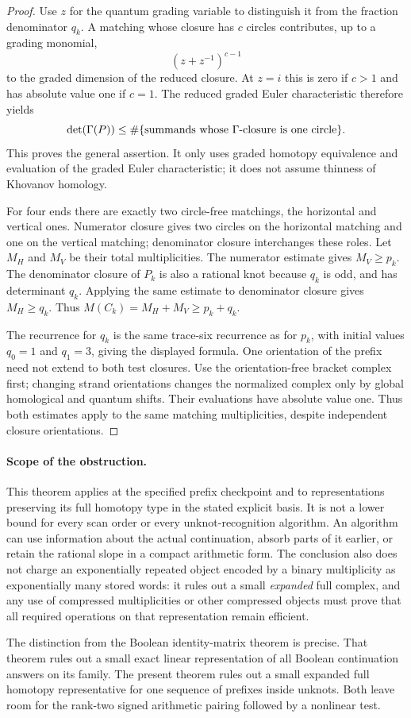 \begin{proof}
Use $z$ for the quantum grading variable to distinguish it from the
fraction denominator $q_k$.  A matching whose closure has $c$
circles contributes, up to a grading monomial,
\[
 (z+z^{-1})^{c-1}
\]
to the graded dimension of the reduced closure.  At $z=i$ this is
zero if $c>1$ and has absolute value one if $c=1$.  The reduced
graded Euler characteristic therefore yields
\[
 \det(\Gamma(P))\le
 \#\{\hbox{summands whose $\Gamma$-closure is one circle}\}.
\]
This proves the general assertion.  It only uses graded homotopy
equivalence and evaluation of the graded Euler characteristic; it
does not assume thinness of Khovanov homology.

For four ends there are exactly two circle-free matchings, the
horizontal and vertical ones.  Numerator closure gives two circles
on the horizontal matching and one on the vertical matching;
denominator closure interchanges these roles.  Let $M_H$ and $M_V$
be their total multiplicities.  The numerator estimate gives
$M_V\ge p_k$.  The denominator closure of $P_k$ is also a rational
knot because $q_k$ is odd, and has determinant $q_k$.  Applying the
same estimate to denominator closure gives $M_H\ge q_k$.  Thus
$M(C_k)=M_H+M_V\ge p_k+q_k$.

The recurrence for $q_k$ is the same trace-six recurrence as for
$p_k$, with initial values $q_0=1$ and $q_1=3$, giving the displayed
formula.  One orientation of the prefix need not extend to both test closures.
Use the orientation-free bracket complex first; changing strand orientations
changes the normalized complex only by global homological and quantum shifts.
Their evaluations have absolute value one. Thus both estimates apply to
the same matching multiplicities, despite independent closure orientations.
\end{proof}

\paragraph{Scope of the obstruction.}
This theorem applies at the specified prefix checkpoint and to
representations preserving its full homotopy type in the stated
explicit basis.  It is not a lower bound for every scan order or
every unknot-recognition algorithm.  An algorithm can use information
about the actual continuation, absorb parts of it earlier, or retain
the rational slope in a compact arithmetic form.  The conclusion
also does not charge an exponentially repeated object encoded by a
binary multiplicity as exponentially many stored words: it rules
out a small \emph{expanded} full complex, and any use of compressed
multiplicities or other compressed objects must prove that all
required operations on that representation remain efficient.

The distinction from the Boolean identity-matrix theorem is precise.
That theorem rules out a small exact linear representation of all
Boolean continuation answers on its family.  The present theorem
rules out a small expanded full homotopy representative for one
sequence of prefixes inside unknots.  Both leave room for the
rank-two signed arithmetic pairing followed by a nonlinear test.
